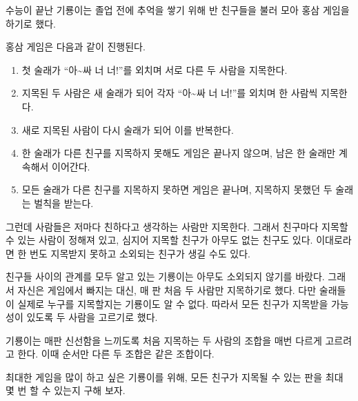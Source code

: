 수능이 끝난 기룡이는 졸업 전에 추억을 쌓기 위해 반 친구들을 불러 모아 홍삼 게임을 하기로 했다.

홍삼 게임은 다음과 같이 진행된다.

\begin{enumerate}
\item 첫 술래가 ``아\textasciitilde{}싸 너 너!''를 외치며 서로 다른 두 사람을 지목한다.
\item 지목된 두 사람은 새 술래가 되어 각자 ``아\textasciitilde{}싸 너 너!''를 외치며 한 사람씩 지목한다.
\item 새로 지목된 사람이 다시 술래가 되어 이를 반복한다.
\item 한 술래가 다른 친구를 지목하지 못해도 게임은 끝나지 않으며, 남은 한 술래만 계속해서 이어간다.
\item 모든 술래가 다른 친구를 지목하지 못하면 게임은 끝나며, 지목하지 못했던 두 술래는 벌칙을 받는다.
\end{enumerate}

그런데 사람들은 저마다 친하다고 생각하는 사람만 지목한다. 
그래서 친구마다 지목할 수 있는 사람이 정해져 있고, 
심지어 지목할 친구가 아무도 없는 친구도 있다.
이대로라면 한 번도 지목받지 못하고 소외되는 친구가 생길 수도 있다.

친구들 사이의 관계를 모두 알고 있는 기룡이는 아무도 소외되지 않기를 바랐다. 
그래서 자신은 게임에서 빠지는 대신, 매 판 처음 두 사람만 지목하기로 했다.
다만 술래들이 실제로 누구를 지목할지는 기룡이도 알 수 없다. 
따라서 모든 친구가 지목받을 가능성이 있도록 두 사람을 고르기로 했다.

기룡이는 매판 신선함을 느끼도록 처음 지목하는 두 사람의 조합을 매번 다르게 고르려고 한다.
이때 순서만 다른 두 조합은 같은 조합이다.

최대한 게임을 많이 하고 싶은 기룡이를 위해, 모든 친구가 지목될 수 있는 판을 최대 몇 번 할 수 있는지 구해 보자.